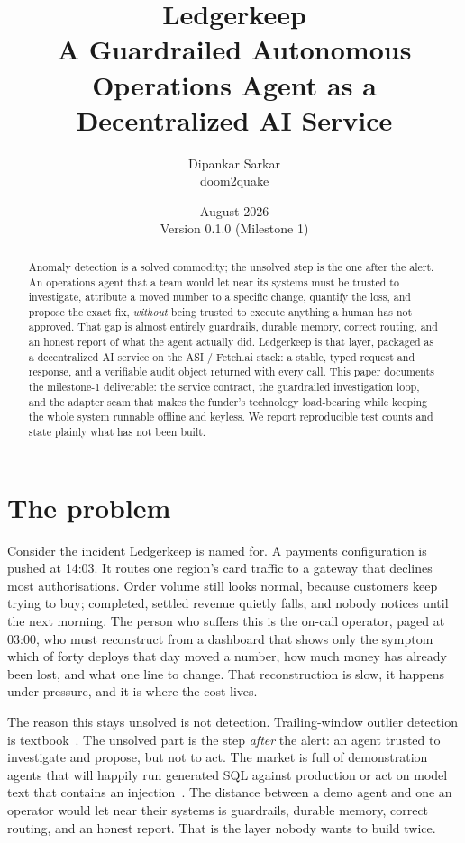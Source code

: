 \documentclass[11pt]{article}
\title{\textbf{Ledgerkeep}\\[2pt]
\large A Guardrailed Autonomous Operations Agent as a Decentralized AI Service}
\author{Dipankar Sarkar \\ \small doom2quake}
\date{August 2026 \\ \small Version 0.1.0 (Milestone 1)}
\begin{document}
\maketitle

\begin{abstract}
Anomaly detection is a solved commodity; the unsolved step is the one after the
alert. An operations agent that a team would let near its systems must be
trusted to investigate, attribute a moved number to a specific change, quantify
the loss, and propose the exact fix, \emph{without} being trusted to execute
anything a human has not approved. That gap is almost entirely guardrails,
durable memory, correct routing, and an honest report of what the agent actually
did. Ledgerkeep is that layer, packaged as a decentralized AI service on the ASI
/ Fetch.ai stack: a stable, typed request and response, and a verifiable audit
object returned with every call. This paper documents the milestone-1
deliverable: the service contract, the guardrailed investigation loop, and the
adapter seam that makes the funder's technology load-bearing while keeping the
whole system runnable offline and keyless. We report reproducible test counts and
state plainly what has not been built.
\end{abstract}

\section{The problem}

Consider the incident Ledgerkeep is named for. A payments configuration is
pushed at 14:03. It routes one region's card traffic to a gateway that declines
most authorisations. Order volume still looks normal, because customers keep
trying to buy; completed, settled revenue quietly falls, and nobody notices
until the next morning. The person who suffers this is the on-call operator,
paged at 03:00, who must reconstruct from a dashboard that shows only the symptom
which of forty deploys that day moved a number, how much money has already been
lost, and what one line to change. That reconstruction is slow, it happens under
pressure, and it is where the cost lives.

The reason this stays unsolved is not detection. Trailing-window outlier
detection is textbook~\cite{grubbs_1969_outliers}. The unsolved part is the step
\emph{after} the alert: an agent trusted to investigate and propose, but not to
act. The market is full of demonstration agents that will happily run generated
SQL against production or act on model text that contains an
injection~\cite{owasp_llm_top10_2025}. The distance between a demo agent and one
an operator would let near their systems is guardrails, durable memory, correct
routing, and an honest report. That is the layer nobody wants to build twice.
\end{document}
